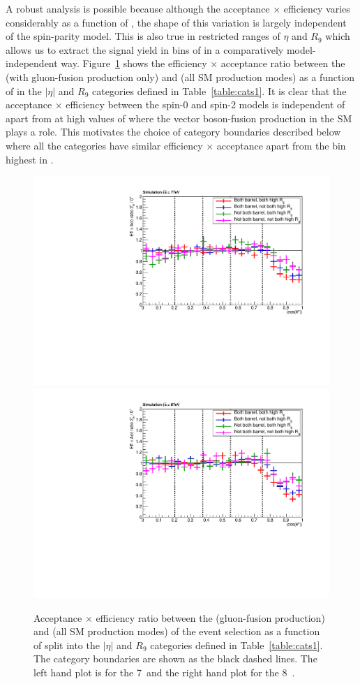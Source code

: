 A robust analysis is possible because although the acceptance $\times$ efficiency varies considerably as a function of \abscostheta, the shape of this variation is largely independent of the spin-parity model. This is also true in restricted ranges of $\eta$ and $R_{9}$ which allows us to extract the signal yield in bins of \abscostheta in a comparatively model-independent way. 
Figure~\ref{fig:eff_acc} shows the efficiency $\times$ acceptance ratio between the \twomp (with gluon-fusion production only) and \zerop (all SM production modes) as a function of \abscostheta in the $|\eta|$ and $R_{9}$ categories defined in Table~\ref{table:cats1}. It is clear that the acceptance $\times$ efficiency between the spin-0 and spin-2 models is independent of \abscostheta apart from at high values of \abscostheta where the vector boson-fusion production in the SM plays a role. This motivates the choice of \abscostheta category boundaries described below where all the categories have similar efficiency $\times$ acceptance apart from the bin highest in \abscostheta.

\begin{figure}
	\begin{center}
	\includegraphics[width=0.49\linewidth]{analysis/plots/spin/effacccats_7TeV.pdf}
	\includegraphics[width=0.49\linewidth]{analysis/plots/spin/effacccats_8TeV.pdf}
  \caption[Acceptance $\times$ efficiency ratio between the \twomp (gluon fusion production) and \zerop (all SM production modes) of the spin analysis event selection]{Acceptance $\times$ efficiency ratio between the \twomp (gluon-fusion production) and \zerop (all SM production modes) of the event selection as a function of \abscostheta split into the $|\eta|$ and $R_{9}$ categories defined in Table~\ref{table:cats1}. The \abscostheta category boundaries are shown as the black dashed lines. The left hand plot is for the 7~\TeV and the right hand plot for the 8~\TeV.}
	\label{fig:eff_acc}
	\end{center}
\end{figure}	


